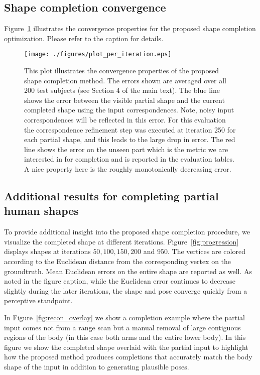 \subsection{Shape completion convergence}
Figure~\ref{fig:convergence} illustrates the convergence properties for the proposed shape completion optimization. Please refer to the caption for details. 
\begin{figure}[th]
\centering
\texttt{[image: ./figures/plot\_per\_iteration.eps]}
\caption{This plot illustrates the convergence properties of the proposed shape completion method. The errors shown are averaged over all 200 test subjects (see Section 4 of the main text). The blue line shows the error between the visible partial shape and the current completed shape using the input correspondences. Note, noisy input correspondences will be reflected in this error. For this evaluation the correspondence refinement step was executed at iteration 250 for each partial shape, and this leads to the large drop in error. The red line shows the error on the unseen part which is the metric we are interested in for completion and is reported in the evaluation tables. A nice property here is the roughly monotonically decreasing error.} 
\label{fig:convergence}
\end{figure}




\subsection{Additional results for completing partial human shapes}
To provide additional insight into the proposed shape completion procedure, we visualize the completed shape at different iterations. Figure~\ref{fig:progression} displays shapes at iterations $50, 100, 150, 200$ and $950$. The vertices are colored according to the Euclidean distance from the corresponding vertex on the groundtruth. Mean Euclidean errors on the entire shape are reported as well. As noted in the figure caption, while the Euclidean error continues to decrease slightly during the later iterations, the shape and pose converge quickly from a perceptive standpoint.

In Figure~\ref{fig:recon_overlay} we show a completion example where the partial input comes not from a range scan but a manual removal of large contiguous regions of the body (in this case both arms and the entire lower body). In this figure we show the completed shape overlaid with the partial input to highlight how the proposed method produces completions that accurately match the body shape of the input in addition to generating plausible poses.

